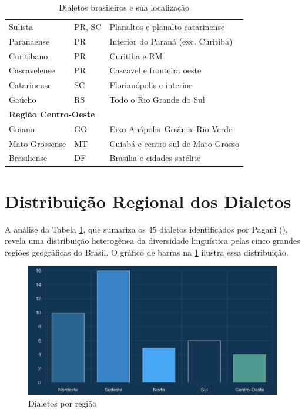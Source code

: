 \begin{table}[ht]
\begin{tabular}{lll}
Sulista      & PR, SC                & Planaltos e planalto catarinense   \\
Paranaense   & PR                    & Interior do Paraná (exc. Curitiba) \\
Curitibano   & PR                    & Curitiba e RM                      \\
Cascavelense & PR                    & Cascavel e fronteira oeste         \\
Catarinense  & SC                    & Florianópolis e interior           \\
Gaúcho       & RS                    & Todo o Rio Grande do Sul           \\
\hline
\multicolumn{3}{l}{\textbf{Região Centro-Oeste}} \\ \hline
Goiano         & GO & Eixo Anápolis–Goiânia–Rio Verde  \\
Mato-Grossense & MT & Cuiabá e centro-sul de Mato Grosso \\
Brasiliense    & DF & Brasília e cidades-satélite        \\
\hline
\end{tabular}
\caption{Dialetos brasileiros e sua localização}
\label{tab:dialetos_pagani}
\end{table}








\section{Distribuição Regional dos Dialetos}


A análise da Tabela \ref{tab:dialetos_pagani}, que sumariza os 45 dialetos identificados por Pagani (\citeyear{pagani2022}), revela uma distribuição heterogênea da diversidade linguística pelas cinco grandes regiões geográficas do Brasil. O gráfico de barras na  \ref{fig:dialetos-por-regiao} ilustra essa distribuição.


\begin{figure}
    \centering
    \includegraphics[width=0.75\linewidth]{images/grafico-dialetos-regiao.png}
    \caption{Dialetos por região}
    \label{fig:dialetos-por-regiao}
\end{figure}


